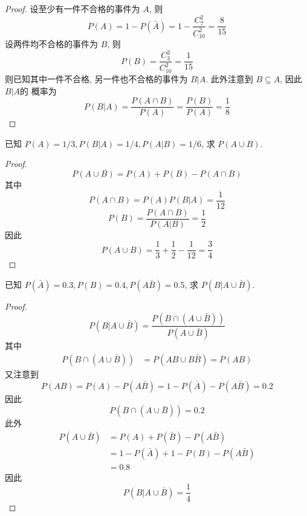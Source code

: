 \documentclass[../main.tex]{subfiles}
\begin{document}
\begin{proof}
设至少有一件不合格的事件为 \(  A  \), 则 \[
P\left( A \right)= 1-P\left( \bar{A} \right)= 1-\frac{C_{7}^{2} }{C_{10}^{2} }=\frac{8 }{15 } 
\] 设两件均不合格的事件为 \(  B  \), 则 \[
P\left( B \right)= \frac{C_{3}^{2} }{C_{10}^{2} }= \frac{1 }{15 }   
\]则已知其中一件不合格, 另一件也不合格的事件为 \(  B|A  \). 此外注意到 \(  B\subseteq A  \), 因此 \(  B|A  \)的  概率为 \[
P\left( B|A \right)= \frac{P\left( A\cap B \right)  }{P\left( A \right)  }= \frac{P\left( B \right)  }{ P\left( A \right) }= \frac{1 }{8 }    
\]
\end{proof}
\begin{exercise}{}{}
已知 $P(A) = 1/3, P(B|A) = 1/4, P(A|B) = 1/6$, 求 $P(A \cup B)$.
\end{exercise}

\begin{proof}
     \[
     P\left( A\cup B \right)= P\left( A \right)+ P\left( B \right)-P\left( A\cap B \right)    
     \]其中 \[
     P\left( A\cap B \right)= P\left( A \right)P\left( B|A \right)= \frac{1 }{12 }    
     \] \[
     P\left( B \right)= \frac{P\left( A\cap B \right)  }{P\left( A|B \right)  }  = \frac{1 }{2 } 
     \]因此 \[
     P\left( A\cup B \right)= \frac{1 }{3 }+ \frac{1 }{2 }-\frac{1 }{12 }= \frac{3 }{4 }     
     \]
\end{proof}
\begin{exercise}{}{}
已知 $P(\bar{A}) = 0.3, P(B) = 0.4, P(A\bar{B}) = 0.5$, 求 $P(B|A \cup \bar{B})$.
\end{exercise}

\begin{proof}
    \[
    P\left( B|A\cup \bar{B} \right)= \frac{P\left( B\cap \left( A\cup \bar{B} \right)  \right)  }{P\left( A\cup \bar{B} \right)  }  
    \]其中 \[
    \begin{aligned}
    P\left( B\cap \left( A\cup \bar{B} \right)  \right)&= P\left( AB\cup B \bar{B} \right)= P\left( AB \right)    
    \end{aligned}
    \]又注意到 \[
    P\left( AB \right)= P\left( A \right)-P\left( A \bar{B} \right)   = 1-P\left( \bar{A} \right)-P\left( A \bar{B} \right)= 0.2  
    \]因此 \[
    P\left( B\cap \left( A\cup \bar{B} \right)  \right)= 0.2 
    \]此外 \[
   \begin{aligned}
    P\left( A\cup \bar{B} \right)&= P\left( A \right)+ P\left( \bar{B} \right)-P\left(  A \bar{B} \right)    \\ 
     &= 1-P\left( \bar{A} \right)+ 1-P\left( B \right)-P\left( A \bar{B} \right)\\ 
      &= 0.8   
   \end{aligned} 
    \]因此 \[
    P\left( B|A\cup \bar{B} \right)= \frac{1 }{4 }  
    \]
\end{proof}
\end{document}

